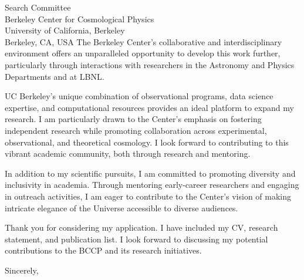 \documentclass[11pt]{letter}
\begin{document}
\begin{letter}{Search Committee \\ Berkeley Center for Cosmological Physics \\ University of California, Berkeley \\ Berkeley, CA, USA}
The Berkeley Center’s collaborative and interdisciplinary environment offers an unparalleled opportunity to develop this work further, particularly through interactions with researchers in the Astronomy and Physics Departments and at LBNL.

UC Berkeley's unique combination of observational programs, data science expertise, and computational resources provides an ideal platform to expand my research. I am particularly drawn to the Center's emphasis on fostering independent research while promoting collaboration across experimental, observational, and theoretical cosmology. I look forward to contributing to this vibrant academic community, both through research and mentoring.

In addition to my scientific pursuits, I am committed to promoting diversity and inclusivity in academia. Through mentoring early-career researchers and engaging in outreach activities, I am eager to contribute to the Center's vision of making intricate elegance of the Universe accessible to diverse audiences.

Thank you for considering my application. I have included my CV, research statement, and publication list. I look forward to discussing my potential contributions to the BCCP and its research initiatives.

\closing{Sincerely,}

\end{letter}
\end{document}
